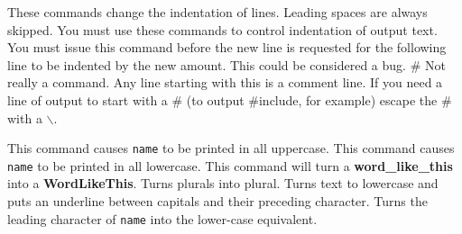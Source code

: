 
\mps
These commands change the indentation of lines. Leading spaces are always 
skipped. You must use these commands to control indentation of output text. 
You must issue this command before the new line is requested for the 
following line to be indented by the new amount. This could be considered a 
bug.
\smallskip
\#
\mps
Not really a command. Any line starting with this is a comment line. If you 
need a line of output to start with a \# (to output \#include, for example) 
escape the \# with a $\backslash$.
	
\medskip
{}
\mps
This command causes {\tt name} to be printed in all uppercase.
\smallskip
{}
\mps
This command causes {\tt name} to be printed in all lowercase.
\smallskip
{}
\mps
This command will turn a {\bf word\_like\_this} into a {\bf WordLikeThis}.
\smallskip
{}
\mps
Turns plurals into plural.
\smallskip
{}
\mps
Turns text to lowercase and puts an underline between capitals and their
preceding character.
\smallskip
{}
\mps
Turns the leading character of {\tt name} into the lower-case equivalent.
\mps

\bye

